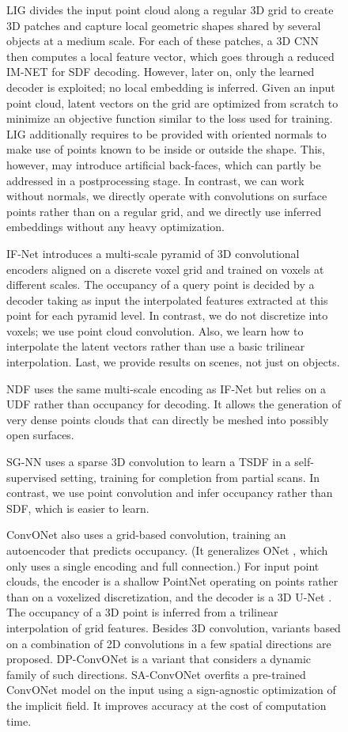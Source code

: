 \documentclass[10pt,twocolumn,letterpaper]{article}
\begin{document}
\begin{figure}[t]
LIG \cite{Jiang2020CVPR} divides the input point cloud along a regular 3D grid to create 3D patches and capture local geometric shapes shared by several objects at a medium scale. For each of these patches, a 3D CNN then computes a local feature vector, which goes through a reduced IM-NET \cite{Chen2019Learning} for SDF decoding. However, later on, only the learned decoder is exploited; no local embedding is inferred. Given an input point cloud, latent vectors on the grid are optimized from scratch to minimize an objective function similar to the loss used for training. LIG additionally requires to be provided with oriented normals to make use of points known to be inside or outside the shape. This, however, may introduce artificial back-faces, which can partly be addressed in a postprocessing stage.
In contrast, we can work without normals, we directly operate with convolutions on surface points rather than on a regular grid, and we directly use inferred embeddings without any heavy optimization.

IF-Net \cite{Chibane2020CVPR} introduces a multi-scale pyramid of 3D convolutional encoders aligned on a discrete voxel grid and trained on voxels at different scales. The occupancy of a query point is decided by a decoder taking as input the interpolated features extracted at this point for each pyramid level.
In contrast, we do not discretize into voxels; we use point cloud convolution. Also, we learn how to interpolate the latent vectors rather than use a basic trilinear interpolation. Last, we provide results on scenes, not just on objects.

NDF \cite{Chibane2020Neural} uses the same multi-scale encoding as IF-Net but relies on a UDF rather than occupancy for decoding. It allows the generation of very dense points clouds that can directly be meshed into possibly open surfaces.

SG-NN \cite{dai2020sgnn} uses a sparse 3D convolution \cite{choy20194d} to learn a TSDF in a self-supervised setting, training for completion from partial scans.
In contrast, we use point convolution and infer occupancy rather than SDF, which is easier to learn.

ConvONet \cite{Peng2020ECCV} also uses a grid-based convolution, training an autoencoder that predicts occupancy. (It generalizes ONet \cite{Mescheder2019CVPR}, which only uses a single encoding and full connection.) For input point clouds, the encoder is a shallow PointNet \cite{Qi2017CVPR} operating on points rather than on a voxelized discretization, and the decoder is a 3D U-Net \cite{Cciccek2016MICCAI}. The occupancy of a 3D point is inferred from a trilinear interpolation of grid features. Besides 3D convolution, variants based on a combination of 2D convolutions in a few spatial directions are proposed. DP-ConvONet \cite{Lionar_2021_WACV} is a variant that considers a dynamic family of such directions.
SA-ConvONet \cite{tang2021sign} overfits a pre-trained ConvONet model on the input using a sign-agnostic optimization of the implicit field. It improves accuracy at the cost of computation time. 


\end{figure}
\end{document}

